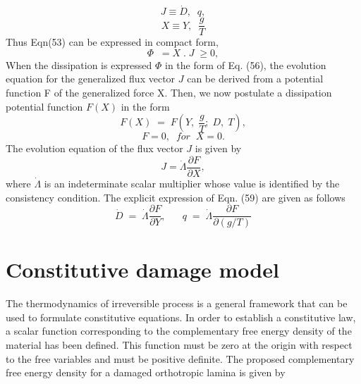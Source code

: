 \begin{equation}
J \equiv {\dot{D},\;\; q},
\end{equation}
\begin{equation}
X \equiv {Y,\;\; \frac{g}{T}}
\end{equation}
Thus Eqn(53) can be expressed in compact form,
\begin{equation}
\Phi\;\; = X\;.\;J \; \geq 0,
\end{equation}
When the dissipation is expressed $\Phi$ in the form of Eq. (56), the evolution equation for the generalized flux vector $J$ can be derived from a potential function F of the generalized force X. Then, we now postulate a dissipation potential function $F(X)$ in the form 
\begin{equation}
F(X) \; = \; F(Y, \; \frac{g}{T}; \; D, \; T),
\end{equation}
\begin{equation}
F = 0, \;\; for \;\; X = 0.
\end{equation}
The evolution equation of the flux vector $J$ is given by
\begin{equation}
J = \dot{\Lambda}\frac{\partial F}{\partial X},
\end{equation}
where $\dot{\Lambda}$ is an indeterminate scalar multiplier whose value is identified by the consistency condition. The explicit expression of Eqn. (59) are given as follows
\begin{equation}
\dot{D} \; = \; \dot{\Lambda}\frac{\partial F}{\partial Y}, \;\;\;\;\;\;  q\; = \; \dot{\Lambda}\frac{\partial F}{\partial (g/T)}
\end{equation}

\section{Constitutive damage model}
\indent\indent\indent  The thermodynamics of irreversible process is a general framework that can be used to formulate constitutive equations.  In order to establish a constitutive law, a scalar function corresponding to the complementary free energy density of the material has been defined. This function must be zero at the origin with respect to the free variables and must be positive definite. The proposed complementary free energy density for a damaged orthotropic lamina is given by

